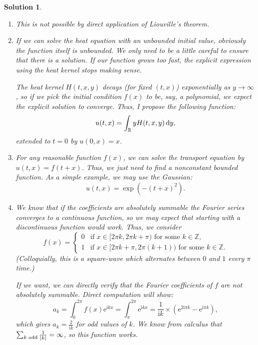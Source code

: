 \documentclass{article}
\theoremstyle{nonumberplain}
\newtheorem{sol}{Solution}
\newcommand{\R}{\mathbb{R}}
\newcommand{\Z}{\mathbb{Z}}
\newcommand{\e}{\mathrm{e}}
\newcommand{\I}{\mathrm{i}}
\DeclarePairedDelimiter{\abs}{\lvert}{\rvert}
\begin{document}
\begin{sol}
\leavevmode
\begin{enumerate}
\item This is not possible by direct application of Liouville's theorem.
\item If we can solve the heat equation with an unbounded initial value, obviously the function itself is unbounded. We only need to be a little careful to ensure that there is a solution. If our function grows too fast, the explicit expression using the heat kernel stops making sense.

The heat kernel $H(t,x,y)$ decays (for fixed $(t,x)$) exponentially as $y \to \infty$, so if we pick the initial condition $f(x)$ to be, say, a polynomial, we expect the explicit solution to converge. Thus, I propose the following function:
\begin{equation}
u(t,x) = \int_\R y H(t,x,y)  \dl y,
\end{equation}
extended to $t = 0$ by $u(0,x) = x$.
\item For any reasonable function $f(x)$, we can solve the transport equation by $u(t,x) = f(t+x)$. Thus, we just need to find a nonconstant bounded function. As a simple example, we may use the Gaussian:
\begin{equation}
u(t,x) = \exp(-(t+x)^2).
\end{equation}
\item We know that if the coefficients are absolutely summable the Fourier series converges to a continuous function, so we may expect that starting with a discontinuous function would work. Thus, we consider
\begin{equation}
f(x) = \begin{cases}
0 & \text{if $x \in [2\pi k, 2\pi k + \pi)$ for some $k \in \Z$,}\\
1 & \text{if $x \in [2\pi k + \pi, 2 \pi (k+1))$ for some $k \in \Z$.}
\end{cases}
\end{equation}
(Colloquially, this is a square-wave which alternates between $0$ and $1$ every $\pi$ time.)

If we want, we can directly verify that the Fourier coefficients of $f$ are not absolutely summable. Direct computation will show:
\begin{equation}
a_k = \int_0^{2\pi} f(x) \e^{\I k x} = \int_\pi^{2\pi} \e^{\I k x} = \frac1{\I k} \times (\e^{2 \I \pi k} - \e^{\I \pi k}),
\end{equation}
which gives $a_k = \frac2{\I k}$ for odd values of $k$. We know from calculus that $\sum_{k \text{ odd}} \frac1{\abs k} = \infty$, so this function works.
\end{enumerate}
\end{sol}
\end{document}
